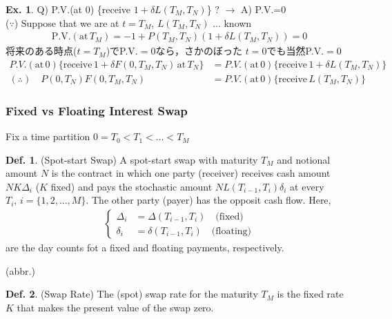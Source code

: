 \documentclass[a4paper,11pt]{jsarticle}
\theoremstyle{definition}
\newtheorem{definition}{Def.}[subsection]
\newtheorem{ex}{Ex.}[subsection]
\begin{document}
\begin{ex}
  Q) P.V.(at $0$) \{receive $1+\delta L(T_M,T_N)$\} ?
  $\rightarrow$ A) P.V.=0 \\
  ($\because$)
  Suppose that we are at $t=T_M$, $L(T_M,T_N)$ ... known 
  \begin{align}
    \mbox{P.V.}(\mbox{at} \, T_M)=-1+P(T_M,T_N)(1+\delta L(T_M,T_N))=0
  \end{align}
  将来のある時点($t=T_M$)でP.V.$=0$なら，さかのぼった
  $t=0$でも当然P.V.$=0$
  \begin{align}
    P.V.(\mbox{at} \, 0)\{\mbox{receive}\,
    1+\delta F(0,T_M,T_N) \, \mbox{at} \, T_N\}
    &= P.V.(\mbox{at} \, 0) \{\mbox{receive} \,
    1+\delta L(T_M,T_N)\} \\
    ( \therefore ) \quad
    P(0,T_N)F(0,T_M,T_N)&=P.V.(\mbox{at} \, 0)
    \{ \mbox{receive} \, L(T_M,T_N)  \}
  \end{align}
\end{ex}


\subsubsection{Fixed vs Floating Interest Swap}
Fix a time partition $0=T_0<T_1<...<T_M$

\begin{definition}{(Spot-start Swap)}
  A spot-start swap with maturity $T_M$ and notional amount
  $N$ is the contract in which one party (receiver)
  receives cash amount $NK\Delta_i$ ($K$ fixed)
  and pays the stochastic amount
  $NL(T_{i-1},T_i)\delta_i$ at every $T_i, \, i=\{1,2,...,M\}$.
  The other party (payer) has the opposit cash flow. Here,
  \begin{align}
    \begin{cases}
      \Delta_i &= \Delta(T_{i-1},T_i) \quad \mbox{(fixed)}\\
      \delta_i &= \delta(T_{i-1},T_i) \quad \mbox{(floating)}
    \end{cases}
  \end{align}
  are the day counts fot a fixed and floating payments, respectively.
\end{definition}
(abbr.)\\

\begin{definition}{(Swap Rate)}
  The (spot) swap rate for the maturity $T_M$ is the fixed rate $K$
  that makes the present value of the swap zero.
\end{definition}
\end{document}
